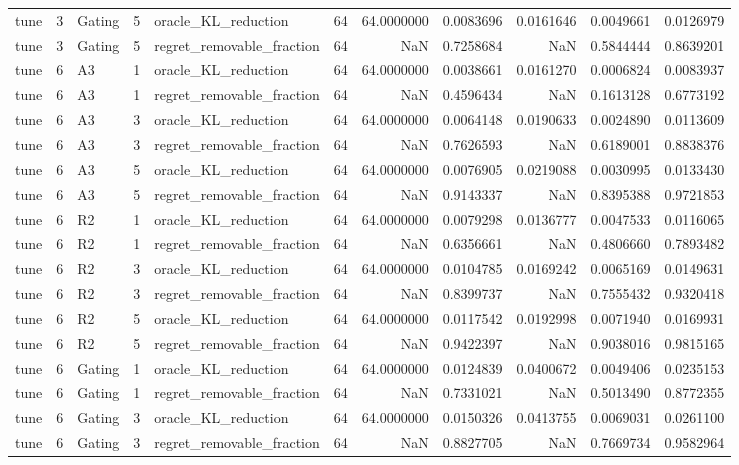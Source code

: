 \begin{tabular}{lrlrlrrrrrr}
tune & 3 & Gating & 5 & oracle_KL_reduction & 64 & 64.0000000 & 0.0083696 & 0.0161646 & 0.0049661 & 0.0126979 \\
tune & 3 & Gating & 5 & regret_removable_fraction & 64 & NaN & 0.7258684 & NaN & 0.5844444 & 0.8639201 \\
tune & 6 & A3 & 1 & oracle_KL_reduction & 64 & 64.0000000 & 0.0038661 & 0.0161270 & 0.0006824 & 0.0083937 \\
tune & 6 & A3 & 1 & regret_removable_fraction & 64 & NaN & 0.4596434 & NaN & 0.1613128 & 0.6773192 \\
tune & 6 & A3 & 3 & oracle_KL_reduction & 64 & 64.0000000 & 0.0064148 & 0.0190633 & 0.0024890 & 0.0113609 \\
tune & 6 & A3 & 3 & regret_removable_fraction & 64 & NaN & 0.7626593 & NaN & 0.6189001 & 0.8838376 \\
tune & 6 & A3 & 5 & oracle_KL_reduction & 64 & 64.0000000 & 0.0076905 & 0.0219088 & 0.0030995 & 0.0133430 \\
tune & 6 & A3 & 5 & regret_removable_fraction & 64 & NaN & 0.9143337 & NaN & 0.8395388 & 0.9721853 \\
tune & 6 & R2 & 1 & oracle_KL_reduction & 64 & 64.0000000 & 0.0079298 & 0.0136777 & 0.0047533 & 0.0116065 \\
tune & 6 & R2 & 1 & regret_removable_fraction & 64 & NaN & 0.6356661 & NaN & 0.4806660 & 0.7893482 \\
tune & 6 & R2 & 3 & oracle_KL_reduction & 64 & 64.0000000 & 0.0104785 & 0.0169242 & 0.0065169 & 0.0149631 \\
tune & 6 & R2 & 3 & regret_removable_fraction & 64 & NaN & 0.8399737 & NaN & 0.7555432 & 0.9320418 \\
tune & 6 & R2 & 5 & oracle_KL_reduction & 64 & 64.0000000 & 0.0117542 & 0.0192998 & 0.0071940 & 0.0169931 \\
tune & 6 & R2 & 5 & regret_removable_fraction & 64 & NaN & 0.9422397 & NaN & 0.9038016 & 0.9815165 \\
tune & 6 & Gating & 1 & oracle_KL_reduction & 64 & 64.0000000 & 0.0124839 & 0.0400672 & 0.0049406 & 0.0235153 \\
tune & 6 & Gating & 1 & regret_removable_fraction & 64 & NaN & 0.7331021 & NaN & 0.5013490 & 0.8772355 \\
tune & 6 & Gating & 3 & oracle_KL_reduction & 64 & 64.0000000 & 0.0150326 & 0.0413755 & 0.0069031 & 0.0261100 \\
tune & 6 & Gating & 3 & regret_removable_fraction & 64 & NaN & 0.8827705 & NaN & 0.7669734 & 0.9582964 \\

\end{tabular}
